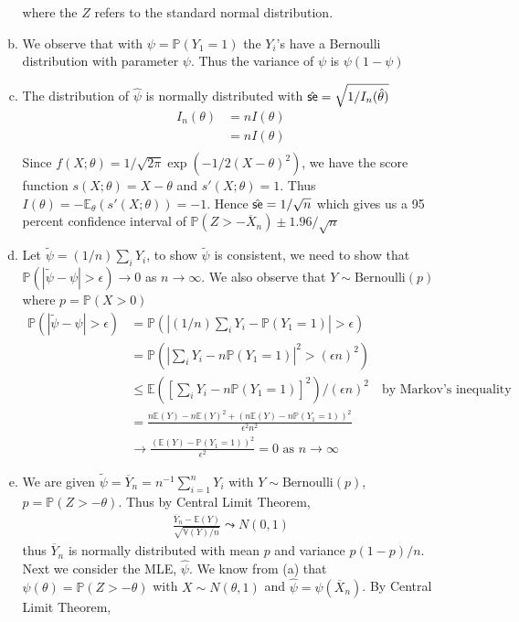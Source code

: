 \documentclass[a4paper,10pt]{article}
\theoremstyle{definition}
\begin{document}
\begin{enumerate}
\begin{enumerate}[(a)]
where the $Z$ refers to the standard normal distribution.
\item We observe that with $\psi = \mathbb{P}(Y_1=1)$ the $Y_i$'s have a Bernoulli distribution with parameter $\psi$. Thus the variance of $\psi$ is $\psi(1-\psi)$
\item The distribution of $\hat{\psi}$ is normally distributed with $\hat{\text{\sffamily se}} = \sqrt{1/I_n(\hat{\theta})}$
\begin{align*}
I_n(\theta) &= nI(\theta)\\
&= nI(\theta)\\
\end{align*}
Since $f(X;\theta) = 1/\sqrt{2\pi}\exp(-1/2(X-\theta)^2)$, we have the score function $s(X;\theta) = X - \theta$ and $s'(X;\theta) = 1$. Thus $I(\theta) = -\mathbb{E}_\theta(s'(X;\theta))=-1$. Hence $\hat{\text{\sffamily se}} = 1/\sqrt{n}$ which gives us a 95 percent confidence interval of $\mathbb{P}\left( Z> -\overline{X}_n\right) \pm 1.96/\sqrt{n}$
\item Let $\tilde{\psi} = (1/n)\sum_iY_i$, to show $\tilde{\psi}$ is consistent, we need to show that $\mathbb{P}(|\tilde{\psi} - \psi|>\epsilon) \to 0$ as $n \to \infty$. We also observe that $Y\sim \text{Bernoulli}(p)$ where $p = \mathbb{P}(X>0)$
\begin{align*}
\mathbb{P}(|\tilde{\psi} - \psi|>\epsilon) &= \mathbb{P}(|(1/n)\sum_iY_i - \mathbb{P}(Y_1=1)|>\epsilon)\\
&=\mathbb{P}\left(\left|\sum_iY_i - n\mathbb{P}(Y_1=1)\right|^2>(\epsilon n)^2\right)\\
&\leq \mathbb{E}\left(\left[\sum_iY_i - n\mathbb{P}(Y_1=1)\right]^2\right)/(\epsilon n)^2\quad \text{by Markov's inequality}\\
&=\frac{n\mathbb{E}(Y)-n\mathbb{E}(Y)^2+\left(n\mathbb{E}(Y)-n\mathbb{P}(Y_1=1)\right)^2}{\epsilon^2n^2}\\
&\to \frac{(\mathbb{E}(Y)-\mathbb{P}(Y_1=1))^2}{\epsilon^2}=0 \text{ as } n \to \infty
\end{align*}
\item We are given $\tilde{\psi} = \overline{Y}_n = n^{-1}\sum_{i=1}^{n}Y_i$ with $Y \sim \text{Bernoulli}(p)$, $p = \mathbb{P}(Z>-\theta)$. Thus by Central Limit Theorem,
\begin{align*}
\frac{\overline{Y}_n-\mathbb{E}(Y)}{\sqrt{\mathbb{V}(Y)/n}} \leadsto N(0,1)
\end{align*}
thus $\overline{Y}_n$ is normally distributed with mean $p$ and variance $p(1-p)/n$. Next we consider the {\sffamily MLE}, $\hat{\psi}$. We know from (a) that $\psi(\theta) = \mathbb{P}(Z > -\theta)$ with $X \sim N(\theta, 1)$ and $\hat{\psi} = \psi(\overline{X}_n)$. By Central Limit Theorem,

\end{enumerate}
\end{enumerate}
\end{document}
